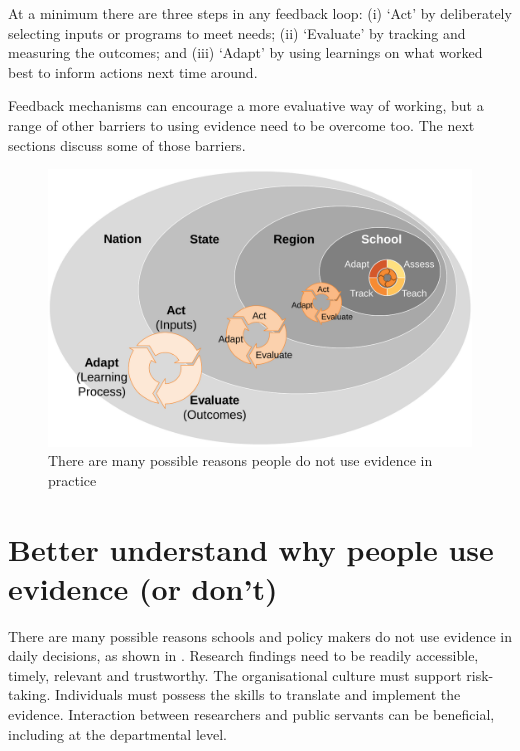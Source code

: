 At a minimum there are three steps in any feedback loop: (i) `Act' by deliberately selecting inputs or programs to meet needs; (ii) `Evaluate' by tracking and measuring the outcomes; and (iii) `Adapt' by using learnings on what worked best to inform actions next time around.

Feedback mechanisms can encourage a more evaluative way of working, but a range of other barriers to using evidence need to be overcome too. The next sections discuss some of those barriers.




\begin{figure}
\caption{There are many possible reasons people do not use evidence in practice\label{fig:There-are-many-possible-reasons-people-do-not-use-evidence-in-practice}}
\includegraphics[page=2]{charts/GonskiReportCharts.pdf}
\end{figure}


\section{Better understand why people use evidence (or don’t)}\label{sec:Better-understand-why-people}

There are many possible reasons schools and policy makers do not use evidence in daily decisions, as shown in .
%
Research findings need to be readily accessible, timely, relevant and trustworthy. The organisational culture must support risk-taking. Individuals must possess the skills to translate and implement the evidence. Interaction between researchers and public servants can be beneficial, including at the departmental level.



